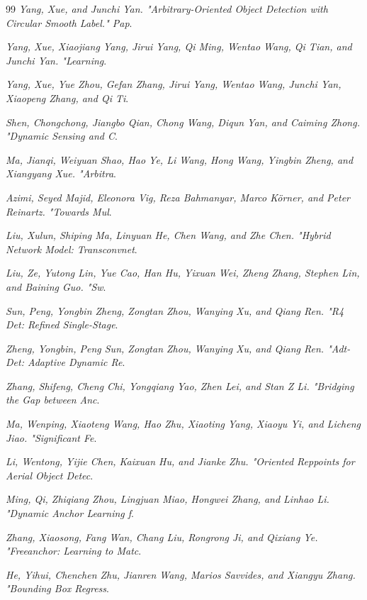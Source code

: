 \documentclass[journal]{IEEEtran}
\begin{document}
\begin{thebibliography}{99}
\textit{Yang, Xue, and Junchi Yan. "Arbitrary-Oriented Object Detection with Circular Smooth Label." Pap}.

\textit{Yang, Xue, Xiaojiang Yang, Jirui Yang, Qi Ming, Wentao Wang, Qi Tian, and Junchi Yan. "Learning}.

\textit{Yang, Xue, Yue Zhou, Gefan Zhang, Jirui Yang, Wentao Wang, Junchi Yan, Xiaopeng Zhang, and Qi Ti}.

\textit{Shen, Chongchong, Jiangbo Qian, Chong Wang, Diqun Yan, and Caiming Zhong. "Dynamic Sensing and C}.

\textit{Ma, Jianqi, Weiyuan Shao, Hao Ye, Li Wang, Hong Wang, Yingbin Zheng, and Xiangyang Xue. "Arbitra}.

\textit{Azimi, Seyed Majid, Eleonora Vig, Reza Bahmanyar, Marco Körner, and Peter Reinartz. "Towards Mul}.

\textit{Liu, Xulun, Shiping Ma, Linyuan He, Chen Wang, and Zhe Chen. "Hybrid Network Model: Transconvnet}.

\textit{Liu, Ze, Yutong Lin, Yue Cao, Han Hu, Yixuan Wei, Zheng Zhang, Stephen Lin, and Baining Guo. "Sw}.

\textit{Sun, Peng, Yongbin Zheng, Zongtan Zhou, Wanying Xu, and Qiang Ren. "R4 Det: Refined Single-Stage}.

\textit{Zheng, Yongbin, Peng Sun, Zongtan Zhou, Wanying Xu, and Qiang Ren. "Adt-Det: Adaptive Dynamic Re}.

\textit{Zhang, Shifeng, Cheng Chi, Yongqiang Yao, Zhen Lei, and Stan Z Li. "Bridging the Gap between Anc}.

\textit{Ma, Wenping, Xiaoteng Wang, Hao Zhu, Xiaoting Yang, Xiaoyu Yi, and Licheng Jiao. "Significant Fe}.

\textit{Li, Wentong, Yijie Chen, Kaixuan Hu, and Jianke Zhu. "Oriented Reppoints for Aerial Object Detec}.

\textit{Ming, Qi, Zhiqiang Zhou, Lingjuan Miao, Hongwei Zhang, and Linhao Li. "Dynamic Anchor Learning f}.

\textit{Zhang, Xiaosong, Fang Wan, Chang Liu, Rongrong Ji, and Qixiang Ye. "Freeanchor: Learning to Matc}.

\textit{He, Yihui, Chenchen Zhu, Jianren Wang, Marios Savvides, and Xiangyu Zhang. "Bounding Box Regress}.


\end{thebibliography}
\end{document}
